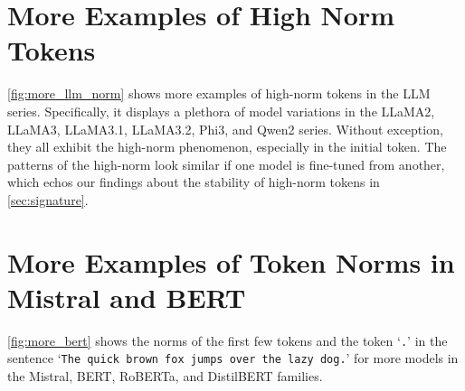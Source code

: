 \section{More Examples of High Norm Tokens}\label{sec:more_high_norm}

\cref{fig:more_llm_norm} shows more examples of high-norm tokens in the LLM series.
Specifically, it displays a plethora of model variations in the LLaMA2, LLaMA3, LLaMA3.1, LLaMA3.2, Phi3, and Qwen2 series.
Without exception, they all exhibit the high-norm phenomenon, especially in the initial token.
The patterns of the high-norm look similar if one model is fine-tuned from another, which echos our findings about the stability of high-norm tokens in \cref{sec:signature}.

\section{More Examples of Token Norms in Mistral and BERT}\label{sec:more_bert}

\cref{fig:more_bert} shows the norms of the first few tokens and the token `\texttt{.}' in the sentence `\texttt{The quick brown fox jumps over the lazy dog.}' for more models in the Mistral, BERT, RoBERTa, and DistilBERT families.


